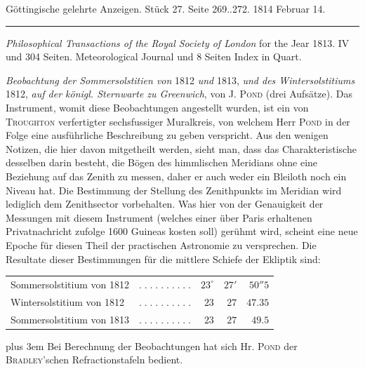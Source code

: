\clearpage
{}

\hypertarget{native-566-lower}{}
\begin{center}\small Göttingische gelehrte Anzeigen. Stück 27. Seite 269..272. 1814 Februar 14.\\[3pt]\rule{.72\linewidth}{.3pt}\end{center}

\emph{Philosophical Transactions of the Royal Society of London} for the Jear 1813. 
IV und 304 Seiten. Meteorological Journal und 8 Seiten Index in Quart.

\emph{Beobachtung der Sommersolstitien von} 1812 \emph{und} 1813, \emph{und des Wintersolstitiums} 1812, \emph{auf der königl. Sternwarte zu Greenwich}, von J. \textsc{Pond} (drei Aufsätze). Das Instrument, womit diese Beobachtungen angestellt wurden, ist ein von \textsc{Troughton} verfertigter sechsfussiger Muralkreis, von welchem Herr \textsc{Pond} in der Folge eine ausführliche Beschreibung zu geben verspricht. Aus den wenigen Notizen, die hier davon mitgetheilt werden, sieht man, dass das Charakteristische desselben darin besteht, die Bögen des himmlischen Meridians ohne eine Beziehung auf das Zenith zu messen, daher er auch weder ein Bleiloth noch ein Niveau hat. Die Bestimmung der Stellung des Zenithpunkts im Meridian wird lediglich dem Zenithsector vorbehalten. Was hier von der Genauigkeit der Messungen mit diesem Instrument (welches einer über Paris erhaltenen Privatnachricht zufolge 1600 Guineas kosten soll) gerühmt wird, scheint eine neue Epoche für diesen Theil der practischen Astronomie zu versprechen. Die Resultate dieser Bestimmungen für die mittlere Schiefe der Ekliptik sind:

\begin{center}\fontsize{9}{11}\selectfont\setlength{\tabcolsep}{3pt}\renewcommand{\arraystretch}{1.18}\begin{tabular}{@{}l c r@{\;}r@{\;}r@{}}
Sommersolstitium von 1812 & $.\;.\;.\;.\;.\;.\;.\;.\;.\;.$ & $23^\circ$ & $27'$ & $50''5$\\
Wintersolstitium von 1812 & $.\;.\;.\;.\;.\;.\;.\;.\;.\;.$ & $23$ & $27$ & $47.35$\\
Sommersolstitium von 1813 & $.\;.\;.\;.\;.\;.\;.\;.\;.\;.$ & $23$ & $27$ & $49.5$\\
\end{tabular}\end{center}

{\rightskip=0pt plus 3em Bei Berechnung der Beobachtungen hat sich Hr. \textsc{Pond} der \textsc{Bradley}'schen Refractionstafeln bedient.\par}

